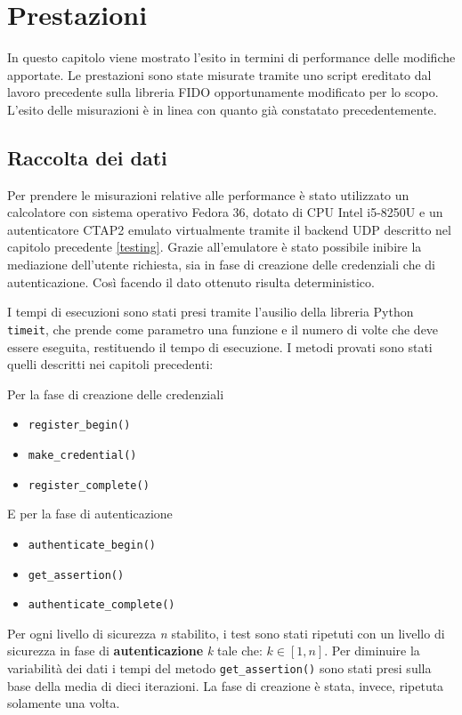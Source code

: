 \chapter{Prestazioni}
\label{prestazioni}

In questo capitolo viene mostrato l'esito in termini di performance delle modifiche apportate. Le prestazioni sono state misurate tramite uno script ereditato dal lavoro precedente sulla libreria FIDO opportunamente modificato per lo scopo. L'esito delle misurazioni è in linea con quanto già constatato precedentemente. 

\section{Raccolta dei dati}
\label{raccolta_dati}

Per prendere le misurazioni relative alle performance è stato utilizzato un calcolatore con sistema operativo Fedora 36, dotato di CPU Intel i5-8250U e un autenticatore CTAP2 emulato virtualmente tramite il backend UDP descritto nel capitolo precedente \ref{testing}. Grazie all'emulatore è stato possibile inibire la mediazione dell'utente richiesta, sia in fase di creazione delle credenziali che di autenticazione. Così facendo il dato ottenuto risulta deterministico.

I tempi di esecuzioni sono stati presi tramite l'ausilio della libreria Python \verb*|timeit|, che prende come parametro una funzione e il numero di volte che deve essere eseguita, restituendo il tempo di esecuzione. I metodi provati sono stati quelli descritti nei capitoli precedenti:

Per la fase di creazione delle credenziali
\begin{itemize}
	\item \verb*|register_begin()|
	\item \verb*|make_credential()|
	\item \verb*|register_complete()|
\end{itemize}
E per la fase di autenticazione
\begin{itemize}
	\item \verb*|authenticate_begin()|
	\item \verb*|get_assertion()|
	\item \verb*|authenticate_complete()|
\end{itemize}

Per ogni livello di sicurezza \emph{n} stabilito, i test sono stati ripetuti con un livello di sicurezza in fase di \textbf{autenticazione} \emph{k} tale che: $k \in [1, n]$. Per diminuire la variabilità dei dati i tempi del metodo \verb*|get_assertion()| sono stati presi sulla base della media di dieci iterazioni. La fase di creazione è stata, invece, ripetuta solamente una volta.

